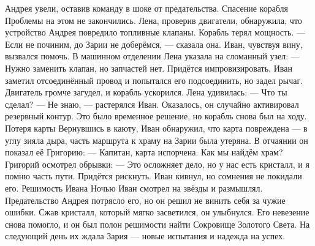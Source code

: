 \documentclass[12pt,a4paper]{book}
\begin{document}
Андрея увели, оставив команду в шоке от предательства.
Спасение корабля
Проблемы на этом не закончились. Лена, проверив двигатели, обнаружила, что устройство Андрея повредило топливные клапаны. Корабль терял мощность.
— Если не починим, до Зарии не доберёмся, — сказала она.
Иван, чувствуя вину, вызвался помочь. В машинном отделении Лена указала на сломанный узел:
— Нужно заменить клапан, но запчастей нет. Придётся импровизировать.
Иван заметил отсоединённый провод и попытался его подсоединить, но задел рычаг. Двигатель громче загудел, и корабль ускорился. Лена удивилась:
— Что ты сделал?
— Не знаю, — растерялся Иван.
Оказалось, он случайно активировал резервный контур. Это было временное решение, но корабль снова был на ходу.
Потеря карты
Вернувшись в каюту, Иван обнаружил, что карта повреждена — в углу зияла дыра, часть маршрута к храму на Зарии была утеряна. В отчаянии он показал её Григорию:
— Капитан, карта испорчена. Как мы найдём храм?
Григорий осмотрел обрывки:
— Это осложняет дело, но у нас есть кристалл, и я помню часть пути. Придётся рискнуть.
Иван кивнул, но сомнения не покидали его.
Решимость Ивана
Ночью Иван смотрел на звёзды и размышлял. Предательство Андрея потрясло его, но он решил не винить себя за чужие ошибки. Сжав кристалл, который мягко засветился, он улыбнулся. Его невезение снова помогло, и он был полон решимости найти Сокровище Золотого Света.
На следующий день их ждала Зария — новые испытания и надежда на успех.
\end{document}
